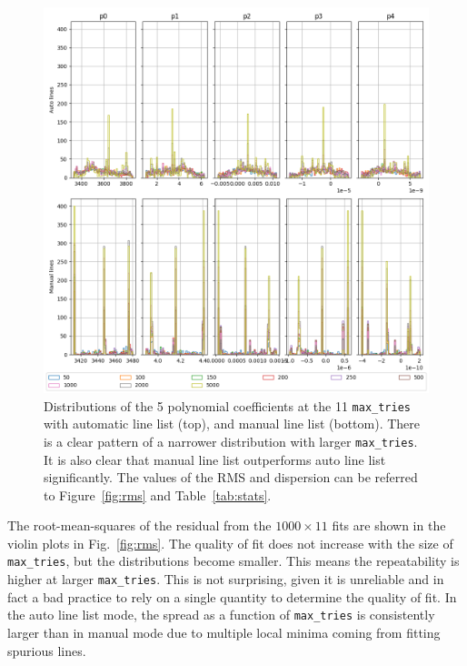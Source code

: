 \documentclass{aa}
\begin{document}
\begin{figure}[h]
    \centering
    \includegraphics[width=\textwidth]{figure_2_polynomial_coefficients.png}
    \caption{Distributions of the 5 polynomial coefficients at the 11 \texttt{max\_tries} with automatic line list (top), and manual line list (bottom). There is a clear pattern of a narrower distribution with larger \texttt{max\_tries}. It is also clear that manual line list outperforms auto line list significantly. The values of the RMS and dispersion can be referred to Figure~\ref{fig:rms} and Table~\ref{tab:stats}.}
    \label{fig:coefficients}
\end{figure}

The root-mean-squares of the residual from the $1000 \times 11$ fits are shown in the
violin plots in Fig.~\ref{fig:rms}. The quality of fit does not increase with the size
of \texttt{max\_tries}, but the distributions become smaller. This means the
repeatability is higher at larger \texttt{max\_tries}. This is not surprising, given
it is unreliable and in fact a bad practice to rely on a single quantity to determine
the quality of fit. In the auto line list mode, the spread as a function of
\texttt{max\_tries} is consistently larger than in manual mode due to multiple local
minima coming from fitting spurious lines.
\end{document}
